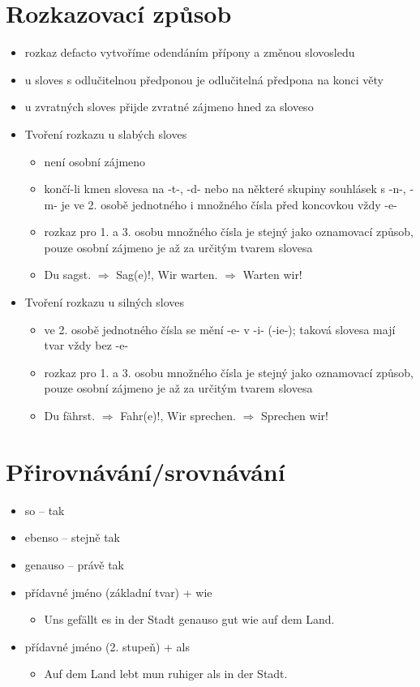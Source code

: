 \documentclass[a4paper,12pt]{report}
\begin{document}
\section{Rozkazovací způsob}

\begin{itemize}
  \item rozkaz defacto vytvoříme odendáním přípony a změnou slovosledu
  \item u sloves s odlučitelnou předponou je odlučitelná předpona na konci věty
  \item u zvratných sloves přijde zvratné zájmeno hned za sloveso
  \item Tvoření rozkazu u slabých sloves
    \begin{itemize}
      \item není osobní zájmeno
      \item končí-li kmen slovesa na -t-, -d- nebo na některé skupiny souhlásek s -n-, -m- je ve 2. osobě jednotného i množného čísla před koncovkou vždy -e-
      \item rozkaz pro 1. a 3. osobu množného čísla je stejný jako oznamovací způsob, pouze osobní zájmeno je až za určitým tvarem slovesa
      \item Du sagst. $\Rightarrow$ Sag(e)!, Wir warten. $\Rightarrow$ Warten wir!
    \end{itemize}
  \item Tvoření rozkazu u silných sloves
    \begin{itemize}
      \item ve 2. osobě jednotného čísla se mění -e- v -i- (-ie-); taková slovesa mají tvar vždy bez -e-
      \item rozkaz pro 1. a 3. osobu množného čísla je stejný jako oznamovací způsob, pouze osobní zájmeno je až za určitým tvarem slovesa
      \item Du fährst. $\Rightarrow$ Fahr(e)!, Wir sprechen. $\Rightarrow$ Sprechen wir!
    \end{itemize}
\end{itemize}

\section{Přirovnávání/srovnávání}

\begin{itemize}
  \item so -- tak
  \item ebenso -- stejně tak
  \item genauso -- právě tak
  \item přídavné jméno (základní tvar) + wie
    \begin{itemize}
      \item Uns gefällt es in der Stadt genauso gut wie auf dem Land.
    \end{itemize}
  \item přídavné jméno (2. stupeň) + als
    \begin{itemize}
      \item Auf dem Land lebt mun ruhiger als in der Stadt.
    \end{itemize}
\end{itemize}
\end{document}
